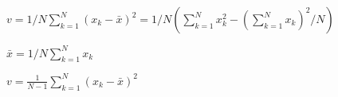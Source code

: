 \documentclass{article}
\begin{document}
$ v = 1/N \sum\limits_{k=1}^{N} (x_k - \bar x)^2 = 1/N \left( \sum\limits_{k=1}^N x_k^2 - \left( \sum\limits_{k=1}^N x_k \right)^2 / N \right) $
\pagebreak

$ \bar x = 1/N \sum\limits_{k=1}^N x_k $
\pagebreak

$ v = \frac{1}{N-1} \sum\limits_{k=1}^{N} (x_k - \bar x)^2 $
\pagebreak
\end{document}
